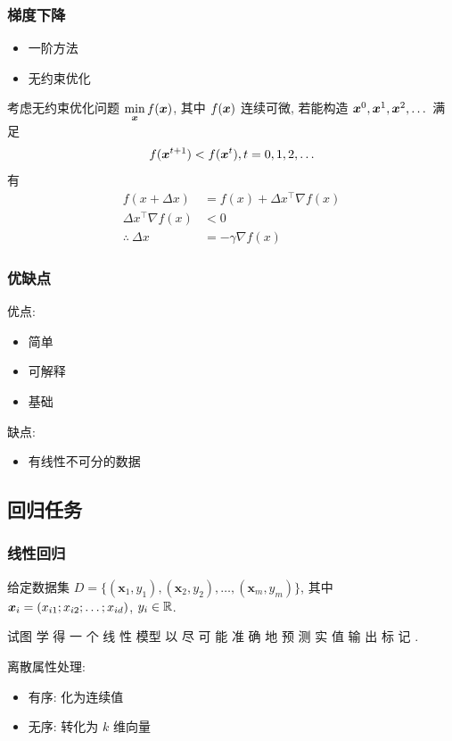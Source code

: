 \subsubsection{梯度下降}
\begin{itemize}
    \item 一阶方法
    \item 无约束优化
\end{itemize}
考虑无约束优化问题 $\displaystyle \min_{\bm{x}} f(\bm{x})$, 其中 $f(\bm{x})$ 连续可微, 若能构造 $\bm{x}^0, \bm{x}^1, \bm{x}^2,\dots$ 满足
\begin{align*}
    f(\bm{x}^{t+1})<f(\bm{x}^t), t=0,1,2,\dots
\end{align*}
有
\begin{align*}
    f(x+\Delta x)&=f(x)+\Delta x^\top \nabla f(x)\\
    \Delta x^\top \nabla f(x)&<0\\
    \therefore\ \Delta x&=-\gamma \nabla f(x)
\end{align*}

\subsubsection{优缺点}
优点:
\begin{itemize}
    \item 简单
    \item 可解释
    \item 基础
\end{itemize}

缺点:
\begin{itemize}
    \item 有线性不可分的数据
\end{itemize}

\subsection{回归任务}
\subsubsection{线性回归}
给定数据集 $D=\{ (\bm x_1, y_1), (\bm x_2, y_2), \dots, (\bm x_m, y_m)  \}$, 其中 $\bm{x}_i=(x_{i1};x_{i2};\dots;x_{id})$, $y_i\in\mathbb{R}$. 

试图 学 得 一 个 线 性 模型 以 尽 可 能 准 确 地 预 测 实 值 输 出 标 记 .

离散属性处理:
\begin{itemize}
    \item 有序: 化为连续值
    \item 无序: 转化为 $k$ 维向量
\end{itemize}

